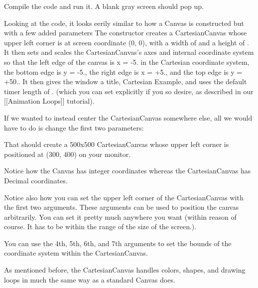 Compile the code and run it. A blank gray screen should pop up.

Looking at the code, it looks eerily similar to how a Canvas is constructed but with a few added parameters The constructor creates a Cartesian\+Canvas whose upper left corner is at screen coordinate {\ttfamily (0, 0)}, with a width of {} and a height of {}. It then sets and scales the Cartesian\+Canvas’s axes and internal coordinate system so that the left edge of the canvas is {\ttfamily x = -\/5.} in the Cartesian coordinate system, the bottom edge is {\ttfamily y = -\/5.}, the right edge is {\ttfamily x = +5.}, and the top edge is {\ttfamily y = +50.}. It then gives the window a title, {\ttfamily Cartesian Example}, and uses the default timer length of {.} (which you can set explicitly if you so desire, as described in our \mbox{[}\mbox{[}Animation Loops\mbox{]}\mbox{]} tutorial).

If we wanted to instead center the Cartesian\+Canvas somewhere else, all we would have to do is change the first two parameters\+:


\begin{DoxyCode}{0}
\DoxyCodeLine{\textcolor{preprocessor}{\#include <tsgl.h>}}
\DoxyCodeLine{}
\DoxyCodeLine{\}}
\end{DoxyCode}


That should create a 500x500 Cartesian\+Canvas whose upper left corner is positioned at {\ttfamily (300, 400)} on your monitor.

Notice how the Canvas has integer coordinates whereas the Cartesian\+Canvas has Decimal coordinates.

Notice also how you can set the upper left corner of the Cartesian\+Canvas with the first two arguments. These arguments can be used to position the canvas arbitrarily. You can set it pretty much anywhere you want (within reason of course. It has to be within the range of the size of the screen.).

You can use the 4th, 5th, 6th, and 7th arguments to set the bounds of the coordinate system within the Cartesian\+Canvas.

As mentioned before, the Cartesian\+Canvas handles colors, shapes, and drawing loops in much the same way as a standard Canvas does.


